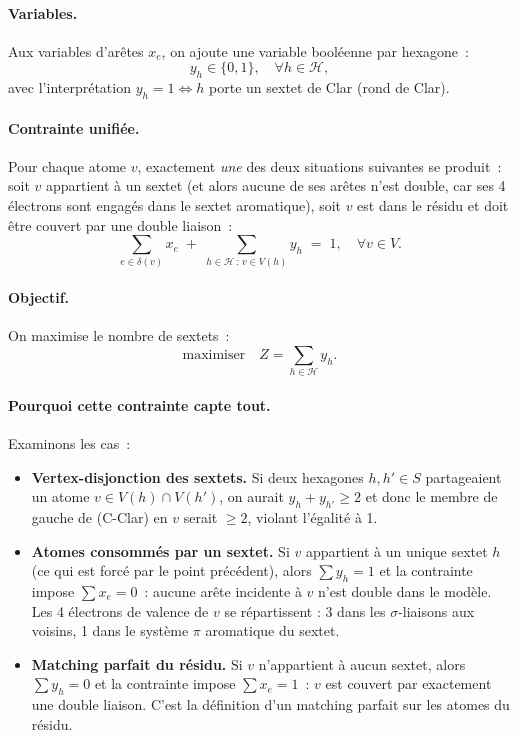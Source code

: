\documentclass[a4paper,11pt]{article}
\begin{document}
\paragraph{Variables.} Aux variables d'ar\^etes $x_e$, on ajoute une variable bool\'eenne par
hexagone~:
\[
  y_h \in \{0, 1\}, \quad \forall h \in \mathcal{H},
\]
avec l'interpr\'etation $y_h = 1 \iff h$ porte un sextet de Clar (rond de Clar).

\paragraph{Contrainte unifi\'ee.} Pour chaque atome $v$, exactement \emph{une} des deux
situations suivantes se produit~: soit $v$ appartient \`a un sextet (et alors aucune de ses
ar\^etes n'est double, car ses 4 \'electrons sont engag\'es dans le sextet aromatique), soit
$v$ est dans le r\'esidu et doit \^etre couvert par une double liaison~:
\begin{equation}
  \sum_{e \in \delta(v)} x_e \;+\; \sum_{h \in \mathcal{H} \,:\, v \in V(h)} y_h \;=\; 1,
  \quad \forall v \in V.
  \tag{C-Clar}
\end{equation}

\paragraph{Objectif.} On maximise le nombre de sextets~:
\begin{equation}
  \text{maximiser} \quad Z = \sum_{h \in \mathcal{H}} y_h.
\end{equation}

\paragraph{Pourquoi cette contrainte capte tout.} Examinons les cas~:
\begin{itemize}
  \item \textbf{Vertex-disjonction des sextets.} Si deux hexagones $h, h' \in S$ partageaient un
    atome $v \in V(h) \cap V(h')$, on aurait $y_h + y_{h'} \geq 2$ et donc le membre de gauche
    de (C-Clar) en $v$ serait $\geq 2$, violant l'\'egalit\'e \`a 1.
  \item \textbf{Atomes consomm\'es par un sextet.} Si $v$ appartient \`a un unique sextet $h$
    (ce qui est forc\'e par le point pr\'ec\'edent), alors $\sum y_h = 1$ et la contrainte
    impose $\sum x_e = 0$~: aucune ar\^ete incidente \`a $v$ n'est double dans le mod\`ele.
    Les 4 \'electrons de valence de $v$ se r\'epartissent : 3 dans les $\sigma$-liaisons aux
    voisins, 1 dans le syst\`eme $\pi$ aromatique du sextet.
  \item \textbf{Matching parfait du r\'esidu.} Si $v$ n'appartient \`a aucun sextet, alors
    $\sum y_h = 0$ et la contrainte impose $\sum x_e = 1$~: $v$ est couvert par exactement une
    double liaison. C'est la d\'efinition d'un matching parfait sur les atomes du r\'esidu.
\end{itemize}
\end{document}
